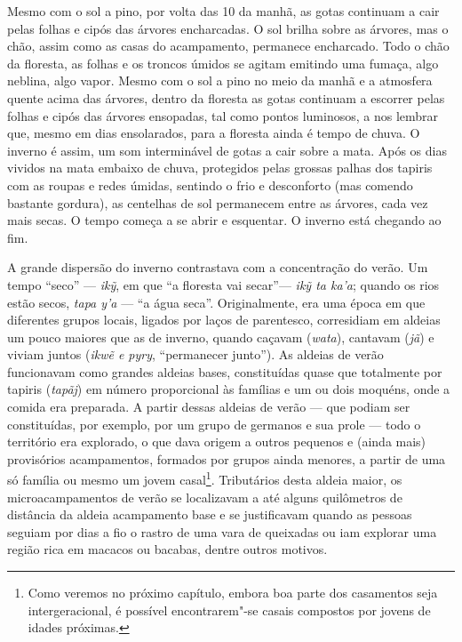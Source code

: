 Mesmo com o sol a pino, por volta das 10 da manhã, as gotas continuam a
cair pelas folhas e cipós das árvores encharcadas. O sol brilha sobre as
árvores, mas o chão, assim como as casas do acampamento, permanece
encharcado. Todo o chão da floresta, as folhas e os troncos úmidos se
agitam emitindo uma fumaça, algo neblina, algo vapor. Mesmo com o sol a
pino no meio da manhã e a atmosfera quente acima das árvores, dentro da
floresta as gotas continuam a escorrer pelas folhas e cipós das árvores
ensopadas, tal como pontos luminosos, a nos lembrar que, mesmo em dias
ensolarados, para a floresta ainda é tempo de chuva. O inverno é assim,
um som interminável de gotas a cair sobre a mata. Após os dias vividos
na mata embaixo de chuva, protegidos pelas grossas palhas dos tapiris
com as roupas e redes úmidas, sentindo o frio e desconforto (mas comendo
bastante gordura), as centelhas de sol permanecem entre as árvores, cada
vez mais secas. O tempo começa a se abrir e esquentar. O inverno está
chegando ao fim.

A grande dispersão do inverno contrastava com a concentração do verão.
Um tempo ``seco'' --- \emph{ikỹ}, em que ``a floresta vai secar''--- \emph{ikỹ
ta ka'a}; quando os rios estão secos, \emph{tapa y'a} --- ``a água seca''.
Originalmente, era uma época em que diferentes grupos locais, ligados
por laços de parentesco, corresidiam em aldeias um pouco maiores que as
de inverno, quando caçavam (\emph{wata}), cantavam (\emph{jã}) e viviam
juntos (\emph{ikwẽ e pyry}, ``permanecer junto''). As aldeias de verão
funcionavam como grandes aldeias bases, constituídas quase que
totalmente por tapiris (\emph{tapãj}) em número proporcional às famílias
e um ou dois moquéns, onde a comida era preparada. A partir dessas
aldeias de verão --- que podiam ser constituídas, por exemplo, por um
grupo de germanos e sua prole --- todo o território era explorado, o que
dava origem a outros pequenos e (ainda mais) provisórios acampamentos,
formados por grupos ainda menores, a partir de uma só família ou mesmo
um jovem casal\footnote{Como veremos no próximo capítulo, embora boa
  parte dos casamentos seja intergeracional, é possível encontrarem"-se
  casais compostos por jovens de idades próximas.}. Tributários desta
aldeia maior, os microacampamentos de verão se localizavam a até alguns
quilômetros de distância da aldeia acampamento base e se justificavam
quando as pessoas seguiam por dias a fio o rastro de uma vara de
queixadas ou iam explorar uma região rica em macacos ou bacabas, dentre
outros motivos.

